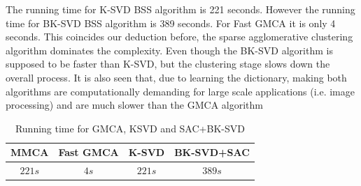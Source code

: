 The running time for K-SVD BSS algorithm is 221 seconds. However the running time for BK-SVD BSS algorithm is 389 seconds. For Fast GMCA it is only 4 seconds. This coincides our deduction before, the sparse agglomerative clustering algorithm dominates the complexity. Even though the BK-SVD algorithm is supposed to be faster than K-SVD, but the clustering stage slows down the overall process. It is also seen that, due to learning the dictionary, making both algorithms are computationally demanding for large scale applications (i.e. image processing) and are much slower than the GMCA algorithm \\
\begin{table}[!htbp]
\centering
    \begin{tabular}{|c|c|c|c|}
    \hline
    MMCA & Fast GMCA & K-SVD & BK-SVD+SAC \\\hline
    $221s$ & $4s$ & $221s$ & $389s$ \\\hline
    \end{tabular}
    \caption{Running time for GMCA, KSVD and SAC+BK-SVD}
\end{table}
 